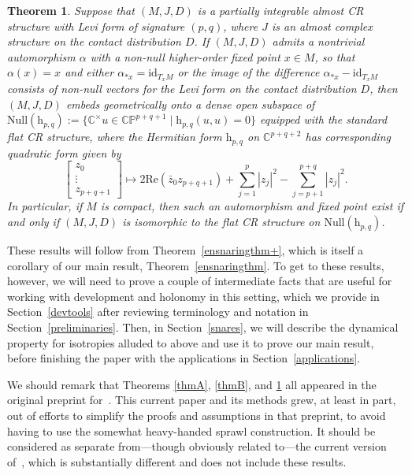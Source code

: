 \documentclass[pdftex]{sigma}
\numberwithin{equation}{section}
\newtheorem{mainthm}{Theorem}
\theoremstyle{definition}
\begin{document}
\begin{mainthm}\label{thmC} Suppose that $(M,J,D)$ is a partially integrable almost CR structure with Levi form of signature $(p,q)$, where $J$ is an almost complex structure on the contact distribution $D$.
If $(M,J,D)$ admits a nontrivial automorphism $\alpha$ with a non-null higher-order fixed point $x\in M$, so that $\alpha(x)=x$ and either $\alpha_{*x}=\mathrm{id}_{T_xM}$ or the image of the difference $\alpha_{*x}-\mathrm{id}_{T_xM}$ consists of non-null vectors for the Levi form on the contact distribution $D$, then $(M,J,D)$ embeds geometrically onto a dense open subspace of $\mathrm{Null}(\mathrm{h}_{p,q}):=\bigl\{\mathbb{C}^\times u\in\mathbb{CP}^{p+q+1}\mid \mathrm{h}_{p,q}(u,u)=0\bigr\}$ equipped with the standard flat CR structure, where the Hermitian form $\mathrm{h}_{p,q}$ on $\mathbb{C}^{p+q+2}$ has corresponding quadratic form given by \[\begin{bmatrix}z_0 \\ \vdots \\ z_{p+q+1}\end{bmatrix}\mapsto 2\mathrm{Re}(\bar{z}_0z_{p+q+1})+\sum_{j=1}^p|z_j|^2-\sum_{j=p+1}^{p+q}|z_j|^2.\] In particular, if $M$ is compact, then such an automorphism and fixed point exist if and only if $(M,J,D)$ is isomorphic to the flat CR structure on $\mathrm{Null}(\mathrm{h}_{p,q})$.\end{mainthm}

These results will follow from Theorem~\ref{ensnaringthm+}, which is itself a corollary of our main result, Theorem~\ref{ensnaringthm}. To get to these results, however, we will need to prove a couple of intermediate facts that are useful for working with development and holonomy in this setting, which we provide in Section~\ref{devtools} after reviewing terminology and notation in Section~\ref{preliminaries}. Then, in Section~\ref{snares}, we will describe the dynamical property for isotropies alluded to above and use it to prove our main result, before finishing the paper with the applications in Section~\ref{applications}.

We should remark that Theorems \ref{thmA}, \ref{thmB}, and \ref{thmC} all appeared in the original preprint for~\cite{SprawlPaper}. This current paper and its methods grew, at least in part, out of efforts to simplify the proofs and assumptions in that preprint, to avoid having to use the somewhat heavy-handed sprawl construction. It should be considered as separate from---though obviously related to---the current version of~\cite{SprawlPaper}, which is substantially different and does not include these results.
\end{document}
